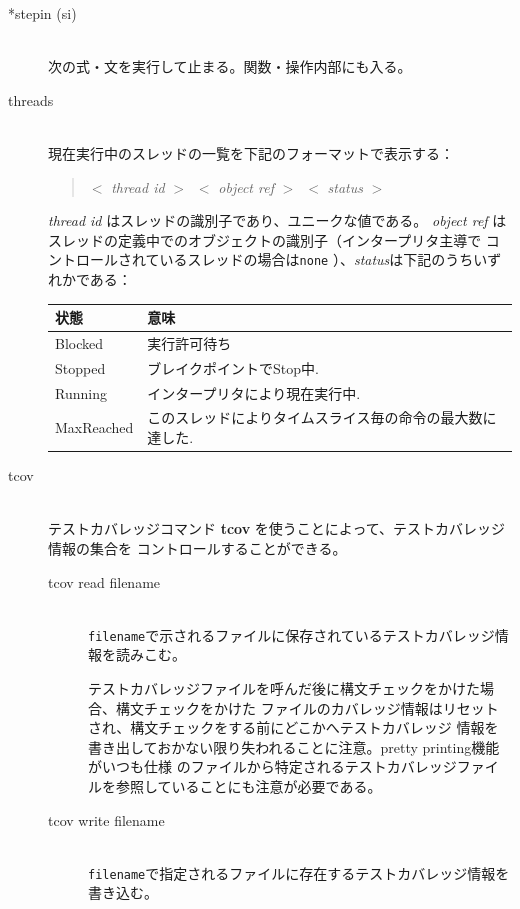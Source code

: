 \documentclass[\pformat,12pt]{jarticle}
\begin{document}
\begin{description}
\item[*stepin (si)] \mbox{}\\
  次の式・文を実行して止まる。関数・操作内部にも入る。


\item[threads]\mbox{}\\
現在実行中のスレッドの一覧を下記のフォーマットで表示する：
\begin{quote}
  $<$ \textit{thread id} $>$\ $<$ \textit{object ref} $>$\ $<$
\textit{status} $>$
\end{quote}
\textit{thread id} はスレッドの識別子であり、ユニークな値である。
\textit{object ref} はスレッドの定義中でのオブジェクトの識別子（インタープリタ主導で
コントロールされているスレッドの場合は\texttt{none} ）、\textit{status}は下記のうちいずれかである：

\begin{tabular}{lp{10cm}}\hline
状態 & 意味 \\ \hline
Blocked    & 実行許可待ち \\ 
Stopped    & ブレイクポイントでStop中.\\
Running    & インタープリタにより現在実行中. \\
MaxReached & このスレッドによりタイムスライス毎の命令の最大数に達した. \\ \hline 
\end{tabular}

\item[tcov]\mbox{}\\
テストカバレッジコマンド {\bf tcov} を使うことによって、テストカバレッジ情報の集合を
コントロールすることができる。

  \begin{description}
  \item[tcov read filename]\mbox{}\\
    {\tt filename}で示されるファイルに保存されているテストカバレッジ情報を読みこむ。

    テストカバレッジファイルを呼んだ後に構文チェックをかけた場合、構文チェックをかけた
    ファイルのカバレッジ情報はリセットされ、構文チェックをする前にどこかへテストカバレッジ
    情報を書き出しておかない限り失われることに注意。pretty printing機能がいつも仕様
    のファイルから特定されるテストカバレッジファイルを参照していることにも注意が必要である。

  \item[tcov write filename]\mbox{} \\
    {\tt filename}で指定されるファイルに存在するテストカバレッジ情報を書き込む。
  

\end{description}
\end{description}
\end{document}
